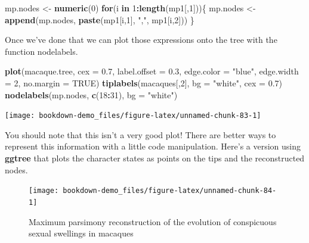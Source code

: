 \documentclass[
]{book}
\newenvironment{Shaded}{\begin{snugshade}}{\end{snugshade}}
\newcommand{\ControlFlowTok}[1]{\textcolor[rgb]{0.13,0.29,0.53}{\textbf{#1}}}
\newcommand{\DataTypeTok}[1]{\textcolor[rgb]{0.13,0.29,0.53}{#1}}
\newcommand{\DecValTok}[1]{\textcolor[rgb]{0.00,0.00,0.81}{#1}}
\newcommand{\FloatTok}[1]{\textcolor[rgb]{0.00,0.00,0.81}{#1}}
\newcommand{\KeywordTok}[1]{\textcolor[rgb]{0.13,0.29,0.53}{\textbf{#1}}}
\newcommand{\NormalTok}[1]{#1}
\newcommand{\OperatorTok}[1]{\textcolor[rgb]{0.81,0.36,0.00}{\textbf{#1}}}
\newcommand{\OtherTok}[1]{\textcolor[rgb]{0.56,0.35,0.01}{#1}}
\newcommand{\StringTok}[1]{\textcolor[rgb]{0.31,0.60,0.02}{#1}}
\begin{document}
\begin{Shaded}
\begin{Highlighting}[]
\NormalTok{mp.nodes \textless{}{-}}\StringTok{ }\KeywordTok{numeric}\NormalTok{(}\DecValTok{0}\NormalTok{)}
\ControlFlowTok{for}\NormalTok{(i }\ControlFlowTok{in} \DecValTok{1}\OperatorTok{:}\KeywordTok{length}\NormalTok{(mp1[,}\DecValTok{1}\NormalTok{]))\{}
\NormalTok{  mp.nodes \textless{}{-}}\StringTok{ }\KeywordTok{append}\NormalTok{(mp.nodes, }\KeywordTok{paste}\NormalTok{(mp1[i,}\DecValTok{1}\NormalTok{], }\StringTok{","}\NormalTok{, mp1[i,}\DecValTok{2}\NormalTok{]))}
\NormalTok{\}}
\end{Highlighting}
\end{Shaded}

Once we've done that we can plot those expressions onto the tree with the function nodelabels.

\begin{Shaded}
\begin{Highlighting}[]
\KeywordTok{plot}\NormalTok{(macaque.tree, }\DataTypeTok{cex =} \FloatTok{0.7}\NormalTok{, }\DataTypeTok{label.offset =} \FloatTok{0.3}\NormalTok{,}
     \DataTypeTok{edge.color =} \StringTok{"blue"}\NormalTok{, }\DataTypeTok{edge.width =} \DecValTok{2}\NormalTok{, }\DataTypeTok{no.margin =} \OtherTok{TRUE}\NormalTok{)      }
\KeywordTok{tiplabels}\NormalTok{(macaques[,}\DecValTok{2}\NormalTok{], }\DataTypeTok{bg =} \StringTok{"white"}\NormalTok{, }\DataTypeTok{cex =} \FloatTok{0.7}\NormalTok{)}
\KeywordTok{nodelabels}\NormalTok{(mp.nodes, }\KeywordTok{c}\NormalTok{(}\DecValTok{18}\OperatorTok{:}\DecValTok{31}\NormalTok{), }\DataTypeTok{bg =} \StringTok{"white"}\NormalTok{)}
\end{Highlighting}
\end{Shaded}

\begin{center}\texttt{[image: bookdown-demo\_files/figure-latex/unnamed-chunk-83-1]} \end{center}

You should note that this isn't a very good plot! There are better ways to represent this information with a little code manipulation. Here's a version using \textbf{ggtree} that plots the character states as points on the tips and the reconstructed nodes.

\begin{figure}[H]

{\centering \texttt{[image: bookdown-demo\_files/figure-latex/unnamed-chunk-84-1]} 

}

\caption{Maximum parsimony reconstruction of the evolution of conspicuous sexual swellings in macaques}\label{fig:unnamed-chunk-84}
\end{figure}
\end{document}
